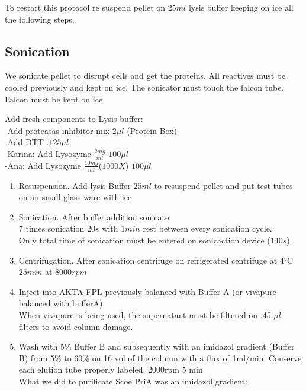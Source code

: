 \documentclass[12pt,twoside]{reedthesis}
\begin{document}
  To restart this protocol re suspend pellet on \(25 ml\) lysis buffer
  keeping on ice all the following steps.
  
  \subsection{Sonication}\label{sonication}
  
  We sonicate pellet to disrupt cells and get the proteins. All reactives
  must be cooled previously and kept on ice. The sonicator must touch the
  falcon tube. Falcon must be kept on ice.
  
  Add fresh components to Lysis buffer:\\
  -Add proteasas inhibitor mix \(2\mu l\) (Protein Box)\\
  -Add DTT \(.1 25\mu l\)\\
  -Karina: Add Lysozyme \(\frac{2mg}{ml}\) \(100\mu l\)\\
  -Ana: Add Lysozyme \(\frac{10mg}{ml}\)(\(1000X\)) \(100\mu l\)
  
  \begin{enumerate}
  \def\labelenumi{\arabic{enumi}.}
  \setcounter{enumi}{1}
  \item
    Resuspension. Add lysis Buffer \(25ml\) to resuspend pellet and put
    test tubes on an small glass ware with ice
  \item
    Sonication. After buffer addition sonicate:\\
    \(7\) times sonication \(20s\) with \(1min\) rest between every
    sonication cycle.\\
    Only total time of sonication must be entered on sonicaction device
    (\(140s\)).
  \item
    Centrifugation. After sonication centrifuge on refrigerated centrifuge
    at 4°C \(25 min\) at \(8000 rpm\)
  \item
    Inject into AKTA-FPL previously balanced with Buffer A (or vivapure
    balanced with bufferA)\\
    When vivapure is being used, the supernatant must be filtered on .45
    \(\mu l\) filters to avoid column damage.
  \item
    Wash with 5\% Buffer B and subsequently with an imidazol gradient
    (Buffer B) from 5\% to 60\% on 16 vol of the column with a flux of
    1ml/min. Conserve each elution tube properly labeled. 2000rpm 5 min\\
    What we did to purificate Scoe PriA was an imidazol gradient:
  \end{enumerate}
  
\end{document}
